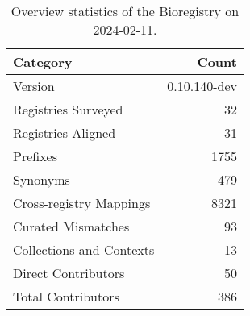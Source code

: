 \begin{table}
\caption{Overview statistics of the Bioregistry on 2024-02-11.}
\label{tab:bioregistry-summary}
\begin{tabular}{lr}
\toprule
Category & Count \\
\midrule
Version & 0.10.140-dev \\
Registries Surveyed & 32 \\
Registries Aligned & 31 \\
Prefixes & 1755 \\
Synonyms & 479 \\
Cross-registry Mappings & 8321 \\
Curated Mismatches & 93 \\
Collections and Contexts & 13 \\
Direct Contributors & 50 \\
Total Contributors & 386 \\
\bottomrule
\end{tabular}
\end{table}
